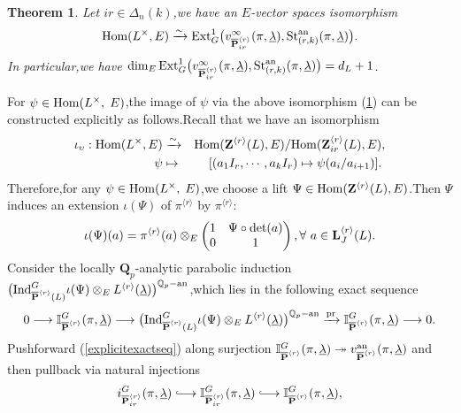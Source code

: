 \documentclass[SecEq,CM,GP]{degruyter-crelle} %
\theoremstyle{plain}
\newtheorem{thm}{Theorem}[section]
\newcommand{\hooklongrightarrow}{\lhook\joinrel\longrightarrow}
\newcommand{\ana}{{\rm an}}
\newcommand{\ext}{{\rm Ext}}
\newcommand{\homo}{{\rm Hom}}
\newcommand{\ind}{{\rm Ind}}
\newcommand{\lrr}{{\langle r\rangle}}
\newcommand{\op}{{\overline{{\mathbf{P}}}}}
\newcommand{\pr}{{\rm pr}}
\newcommand{\st}{{\rm St}}
\newcommand{\ul}{\underline}
\newcommand{\BI}{{\mathbb{I}}}
\newcommand{\BQ}{{\mathbb{Q}}}
\newcommand{\bL}{{\mathbf{L}}}
\newcommand{\bQ}{{\mathbf{Q}}}
\newcommand{\bZ}{{\mathbf{Z}}}
\begin{document}
\begin{thm}\label{thmintroLINV}
Let $ir\in {\Delta_n(k)}$,\;we have an $E$-vector spaces isomorphism
\begin{equation}\label{thmintro}
	\homo(L^\times,E)\xrightarrow{\sim }\ext^1_{G}\big(v_{\op^{\lrr}_{ir}}^{\infty}(\pi,\ul{\lambda}), \st_{(r,k)}^{\ana}(\pi,\ul{\lambda})\big).
\end{equation}
In particular,\;we have $\dim_E  \ext^1_{G}\big(v_{\op^{\lrr}_{ir}}^{\infty}(\pi,\ul{\lambda}), \st_{(r,k)}^{\ana}(\pi,\ul{\lambda})\big)=d_L+1$.\;
\end{thm}
For $\psi\in\homo(L^{\times},\;E)$,\;the image of $\psi$ via the above isomorphism (\ref{thmintroLINV}) can be constructed explicitly as follows.\;Recall that we have an isomorphism 
\begin{equation}
\begin{aligned}
	\iota_\upsilon: \homo(L^{\times},E) &\xrightarrow{\sim} & \homo(\bZ^{\lrr}(L),E)/\homo(\bZ^{\lrr}_{ir}(L),E),\\
	\psi& \mapsto& [(a_1I_{r},\cdots, a_{k}I_{r})\mapsto \psi(a_i/a_{i+1})].\;
\end{aligned}
\end{equation}
Therefore,\;for any $\psi\in\homo(L^{\times},\;E)$,\;we choose a lift $\Psi\in \homo(\bZ^{\lrr}(L),E)$.\;Then  $\Psi$ induces an extension $\iota(\Psi)$ of $\pi^{\lrr}$ by $\pi^{\lrr}$:
\begin{equation*}
\iota(\Psi)(a)=\pi^{\lrr}(a)\otimes_E\begin{pmatrix}
	1 & \Psi\circ\det(a) \\ 0 & 1
\end{pmatrix}, \\ \forall ~a\in \bL^{\lrr}_{J}(L).
\end{equation*}
Consider the locally $\bQ_p$-analytic parabolic induction $\big(\ind_{\op^{\lrr}(L)}^G \iota(\Psi)\otimes_EL^{\lrr}(\ul{\lambda})\big)^{\BQ_p-\ana}$,\;which lies in the following exact sequence
\begin{equation}\label{explicitexactseq}
0 \longrightarrow \BI_{\op^{\lrr}}^G(\pi,\ul{\lambda}) \longrightarrow \big(\ind_{\op^{\lrr}(L)}^G \iota(\Psi)\otimes_EL^{\lrr}(\ul{\lambda})\big)^{\BQ_p-\ana} \xrightarrow{\pr} \BI_{\op^{\lrr}}^G(\pi,\ul{\lambda}) \longrightarrow 0.
\end{equation}
Pushforward (\ref{explicitexactseq}) along surjection $\BI_{\op^{\lrr}}^G(\pi,\ul{\lambda})\twoheadrightarrow v^{\ana}_{\op^{\lrr}}(\pi,\ul{\lambda})$ and then pullback via natural injections
\begin{equation*}i_{\op^{\lrr}_{{ir}}}^G(\pi,\ul{\lambda}) \hooklongrightarrow \BI_{\op^{\lrr}_{{ir}}}^G(\pi,\ul{\lambda}) \hooklongrightarrow \BI_{\op^{\lrr}}^G(\pi,\ul{\lambda}),
\end{equation*}
\end{document}
